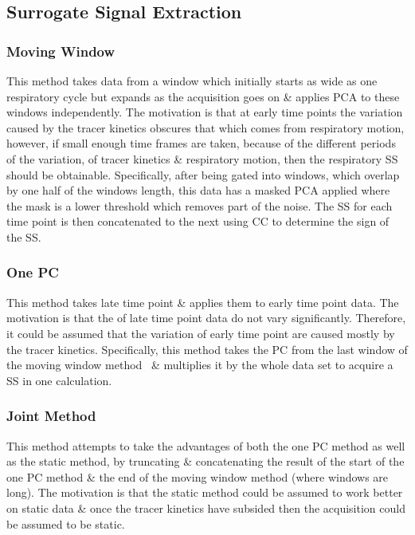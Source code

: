     \subsection{Surrogate Signal Extraction} \label{sec:surrogate_signal_extraction}
        \subsubsection{Moving Window} \label{sec:moving_window}
            This method takes data from a window which initially starts as wide as one respiratory cycle but expands as the acquisition goes on \& applies \gls{PCA} to these windows independently. The motivation is that at early time points the variation caused by the tracer kinetics obscures that which comes from respiratory motion, however, if small enough time frames are taken, because of the different periods of the variation, of tracer kinetics \& respiratory motion, then the respiratory \gls{SS} should be obtainable. Specifically, after being gated into windows, which overlap by one half of the windows length, this data has a masked \gls{PCA} applied where the mask is a lower threshold which removes part of the noise. The \gls{SS} for each time point is then concatenated to the next using \gls{CC} to determine the sign of the \gls{SS}.
        
        \subsubsection{One \gls{PC}} \label{sec:one_pc}
            This method takes late time point  \& applies them to early time point data. The motivation is that the  of late time point data do not vary significantly. Therefore, it could be assumed that the variation of early time point  are caused mostly by the tracer kinetics. Specifically, this method takes the \gls{PC} from the last window of the moving window method~ \& multiplies it by the whole data set to acquire a \gls{SS} in one calculation.
        
        \subsubsection{Joint Method} \label{sec:joint_method}
            This method attempts to take the advantages of both the one \gls{PC} method as well as the static method, by truncating \& concatenating the result of the start of the one \gls{PC} method \& the end of the moving window method (where windows are long). The motivation is that the static method could be assumed to work better on static data \& once the tracer kinetics have subsided then the acquisition could be assumed to be static.
    
